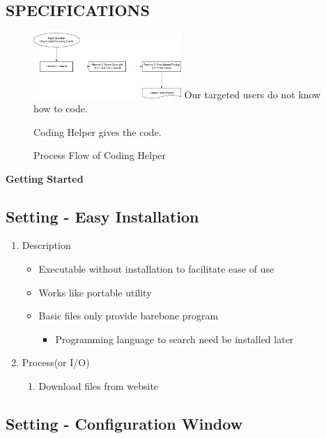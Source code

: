 \documentclass[conference]{IEEEtran}
\begin{document}
\begin{itemize}
\begin{itemize}
\begin{itemize}
\begin{itemize}
\section{SPECIFICATIONS} %
\label{sec:specifications}

\begin{figure}[ht]
\centering
\includegraphics[width=0.5\textwidth]{./figures/Process_Flow.png}
Our targeted users do not know how to code.

Coding Helper gives the code.
\caption{Process Flow of Coding Helper}
\label{fig_process_flow}
\end{figure}


\textbf{Getting Started}

\subsection{Setting - Easy Installation}

\begin{enumerate}
  \item Description
  \begin{itemize}
    \item Executable without installation to facilitate ease of use
    \item Works like portable utility
    \item Basic files only provide barebone program
    \begin{itemize}
      \item Programming language to search need be installed later
    \end{itemize}
  \end{itemize}
  \item Process(or I/O)
  \begin{enumerate}
    \item Download files from website
  \end{enumerate}
\end{enumerate}
\textit{}


\subsection{Setting - Configuration Window}


\end{itemize}
\end{itemize}
\end{itemize}
\end{itemize}
\end{document}
